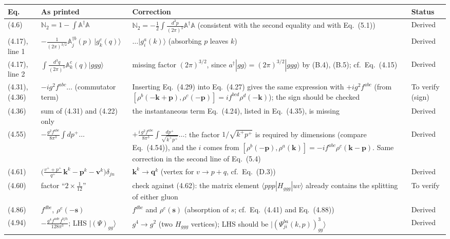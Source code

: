 \documentclass[11pt,a4paper]{article}
\newcommand{\bk}{\mathbf{k}}
\newcommand{\bp}{\mathbf{p}}
\newcommand{\bq}{\mathbf{q}}
\newcommand{\Hggg}{H_{ggg}}
\newcommand{\eq}[1]{Eq.~(#1)}
\begin{document}
\small
\renewcommand{\arraystretch}{1.35}
\begin{longtable}{>{\raggedright\arraybackslash}p{1.25cm}>{\raggedright\arraybackslash}p{4.6cm}>{\raggedright\arraybackslash}p{5.6cm}>{\raggedright\arraybackslash}p{2.6cm}}
\toprule
\textbf{Eq.} & \textbf{As printed} & \textbf{Correction} & \textbf{Status}\\
\midrule
\endhead
(4.6) & $\mathbb N_2=1-\int\mathbb A^\dagger\mathbb A$ & $\mathbb N_2=-\tfrac12\int\frac{d^3p}{(2\pi)^3}\mathbb A^\dagger\mathbb A$ (consistent with the second equality and with \eq{5.1}) & Derived\\
(4.17), line 1 & $-\frac{1}{(2\pi)^{3/2}}\mathbb A^{\dagger b}_j(p)\,|g^c_k(q)\rangle$ & $\dots|g^a_i(k)\rangle$ (absorbing $p$ leaves $k$) & Derived\\
(4.17), line 2 & $\int\frac{d^3q}{(2\pi)^3}\mathbb A^c_k(q)|ggg\rangle$ & missing factor $(2\pi)^{3/2}$, since $a^\dagger|gg\rangle=(2\pi)^{3/2}|ggg\rangle$ by (B.4), (B.5); cf.\ \eq{4.15} & Derived\\
(4.31), (4.36) & $-ig^2f^{abc}\dots$ (commutator term) & Inserting \eq{4.29} into \eq{4.27} gives the same expression with $+ig^2f^{abc}$ (from $[\rho^b(-\bk+\bp),\rho^c(-\bp)]=if^{bcd}\rho^d(-\bk)$); the sign should be checked & To verify (sign)\\
(4.36) & sum of (4.31) and (4.22) only & the instantaneous term \eq{4.24}, listed in \eq{4.35}, is missing & Derived\\
(4.55) & $-\frac{g^2f^{abc}}{8\pi^3}\int dp^+\dots$ & $+\frac{i\,g^2f^{abc}}{8\pi^3}\int\frac{dp^+}{\sqrt{k^+p^+}}\dots$: the factor $1/\sqrt{k^+p^+}$ is required by dimensions (compare \eq{4.54}), and the $i$ comes from $[\rho^b(-\bp),\rho^a(\bk)]=-if^{abc}\rho^c(\bk-\bp)$. Same correction in the second line of \eq{5.4} & Derived\\
(4.61) & $\big(\frac{v^++p^+}{q^+}\,\mathbf k^k-\bp^k-\mathbf v^k\big)\delta_{jn}$ & $\mathbf k^k\to\bq^k$ (vertex for $v\to p+q$, cf.\ \eq{D.3}) & Derived\\
(4.60) & factor ``$2\times\frac1{12}$'' & check against (4.62): the matrix element $\langle ppp|\Hggg|uv\rangle$ already contains the splitting of either gluon & To verify\\
(4.86) & $f^{dbe}$, $\rho^e(-\mathbf s)$ & $f^{dbc}$ and $\rho^e(\mathbf s)$ (absorption of $s$; cf.\ \eq{4.41} and \eq{4.88}) & Derived\\
(4.94) & $-\frac{g^4f^{ade}f^{bfh}}{128\pi^3}$; LHS $|(\Psi)_{gg}\rangle$ & $g^4\to g^2$ (two $\Hggg$ vertices); LHS should be $|(\Psi^{ba}_{ji}(k,p))^3_{gg}\rangle$ & Derived\\

\end{longtable}
\end{document}
